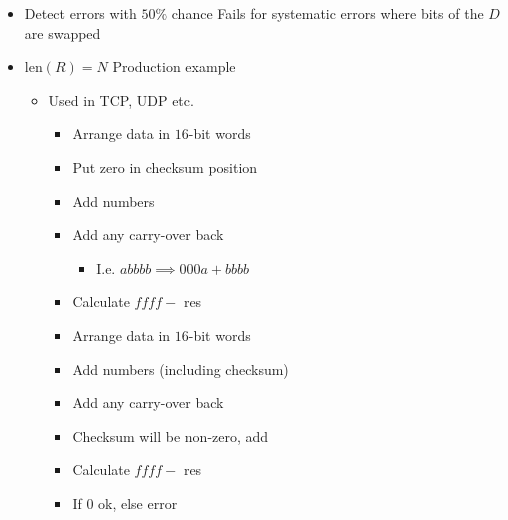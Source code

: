 \begin{itemize}
\begin{itemize}
\begin{itemize}
                    \item Detect errors with $50\%$ chance
                    \icon Fails for systematic errors where bits of the $D$ are swapped
                \end{itemize}
                \begin{itemize}
                    \item $\text{len}(R) = N$
                     Production example
                        \begin{itemize}
                            \item Used in TCP, UDP etc.
                                \begin{itemize}
                                    \item Arrange data in $16$-bit words
                                    \item Put zero in checksum position
                                    \item Add numbers
                                    \item Add any carry-over back
                                        \begin{itemize}
                                            \item I.e. $abbbb \implies 000a + bbbb$
                                        \end{itemize}
                                    \item Calculate $ffff -$ res
                                \end{itemize}
                                \begin{itemize}
                                    \item Arrange data in $16$-bit words
                                    \item Add numbers (including checksum)
                                    \item Add any carry-over back
                                    \item Checksum will be non-zero, add
                                    \item Calculate $ffff -$ res
                                    \item If $0$ ok, else error
                                \end{itemize}

\end{itemize}
\end{itemize}
\end{itemize}
\end{itemize}
